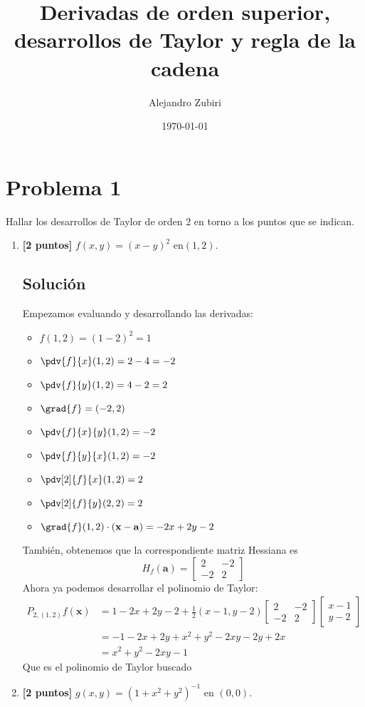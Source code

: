 \documentclass[12pt,a4paper,reqno]{article}
\title{Derivadas de orden superior, desarrollos de Taylor y regla de la cadena}
\date{\today}
\author{Alejandro Zubiri}
\begin{document}
	\maketitle
	\section{Problema 1}
	Hallar los desarrollos de Taylor de orden 2 en torno a los puntos que se indican.
	\begin{enumerate}[label={(\alph*)}]
		\item \textbf{[2 puntos]} $f(x,y)=(x-y)^2$ en$(1,2)$.
		
		\subsection*{Solución}
		Empezamos evaluando y desarrollando las derivadas:
		\begin{itemize}
			\item $f(1,2)=(1-2) ^{2}=1$
			\item $\pdv{f}{x}(1,2)=2-4=-2$
			\item $\pdv{f}{y}(1,2)=4-2=2$
			\item $\grad{f}=(-2,2)$ 
			\item $\pdv{f}{x}{y}(1,2)=-2$ 
			\item $\pdv{f}{y}{x}(1,2)=-2$
			\item $\pdv[2]{f}{x}(1,2)=2$
			\item $\pdv[2]{f}{y}(2,2)=2$ 
			\item $\grad{f}(1,2)\cdot (\mathbf{x}-\mathbf{a})=-2x+2y-2$ 
		\end{itemize}
	También, obtenemos que la correspondiente matriz Hessiana es
	\[
	H_{f}(\mathbf{a})= \begin{bmatrix}
		2 & -2 \\ -2 & 2
	\end{bmatrix}
	\]
	Ahora ya podemos desarrollar el polinomio de Taylor:
	\begin{equation}
		\begin{split}
			P_{2,(1,2)}f(\mathbf{x})&=1-2x+2y-2+ \frac{1}{2}(x-1,y-2) \begin{bmatrix}
				2 & -2 \\ -2 & 2	
			\end{bmatrix} \begin{bmatrix}
				x-1 \\ y -2
			\end{bmatrix}\\
			&=-1 -2x +2y +x ^{2}+y ^{2} -2xy -2y +2x\\
			&=x ^{2}+y ^{2} -2xy -1
		\end{split}
	\end{equation}
	Que es el polinomio de Taylor buscado		
\item \textbf{[2 puntos]} $g(x,y)=(1+x^2+y^2)^{-1}$ en $(0,0)$.
		

\end{enumerate}
\end{document}
